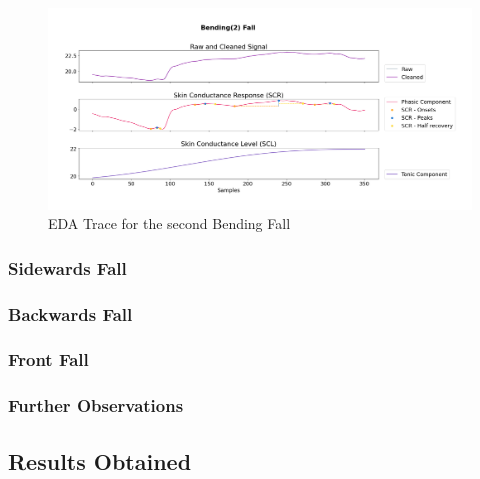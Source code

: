 \begin{figure}[H]
    \centering
    \includegraphics[width=\textwidth]{./images/movisens/Bending2.png}
    \caption{EDA Trace for the second Bending Fall}
    \label{fig:movisens-bending2}
\end{figure}

\subsubsection{Sidewards Fall}\label{subsubsec:sidewards-fall}

\subsubsection{Backwards Fall}\label{subsubsec:backwards-fall}

\subsubsection{Front Fall}\label{subsubsec:front-fall}

\subsubsection{Further Observations}\label{subsubsec:further-observations}

\subsection{Results Obtained}\label{subsec:summary-results}


